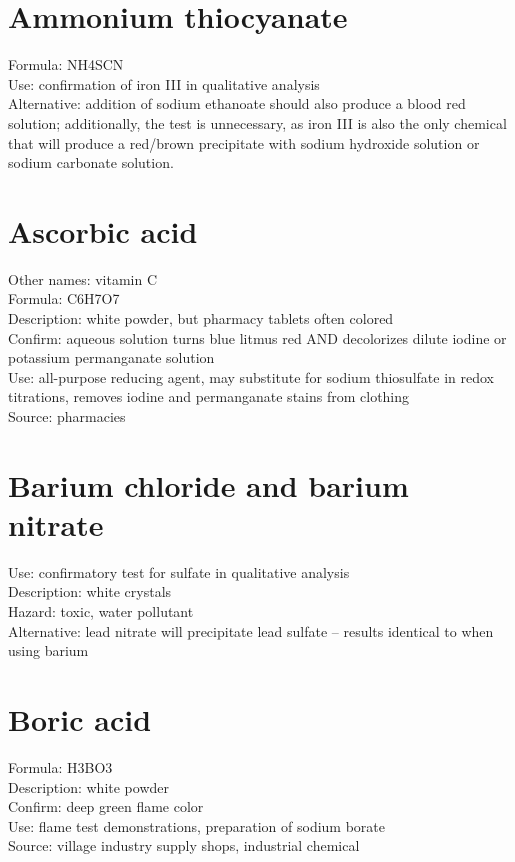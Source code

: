 \section{Ammonium thiocyanate}
Formula: NH4SCN\\
Use: confirmation of iron III in qualitative analysis\\
Alternative: addition of sodium ethanoate 
should also produce a blood red solution; 
additionally, 
the test is unnecessary, 
as iron III is also the only chemical 
that will produce a red/brown precipitate with sodium hydroxide solution 
or sodium carbonate solution.

\section{Ascorbic acid}
Other names: vitamin C\\
Formula: C6H7O7\\
Description: white powder, 
but pharmacy tablets often colored\\
Confirm: aqueous solution turns blue litmus red 
AND decolorizes dilute iodine or potassium permanganate solution\\
Use: all-purpose reducing agent, 
may substitute for sodium thiosulfate in redox titrations, 
removes iodine and permanganate stains from clothing\\
Source: pharmacies

\section{Barium chloride and barium nitrate}
Use: confirmatory test for sulfate in qualitative analysis\\
Description: white crystals\\
Hazard: toxic, 
water pollutant\\
Alternative: lead nitrate will precipitate lead sulfate – 
results identical to when using barium

\section{Boric acid}
Formula: H3BO3\\
Description: white powder\\
Confirm: deep green flame color\\
Use: flame test demonstrations, preparation of sodium borate\\
Source: village industry supply shops, industrial chemical

